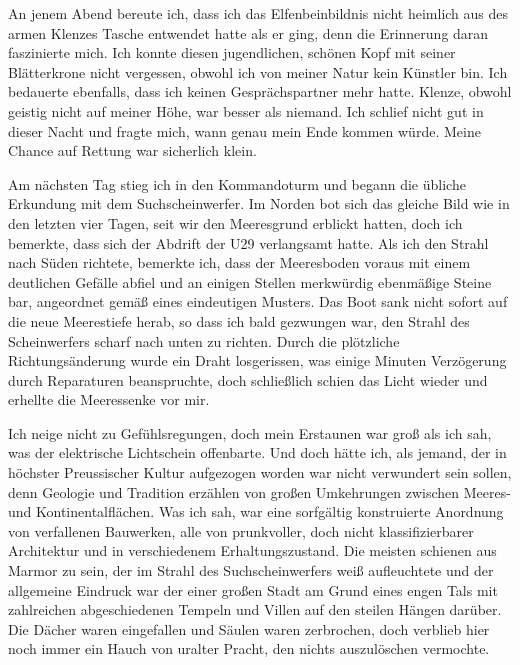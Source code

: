 \documentclass[a4paper]{memoir}
\begin{document}
An jenem Abend bereute ich, dass ich das Elfenbeinbildnis nicht heimlich aus des armen Klenzes Tasche entwendet hatte als er ging, denn die Erinnerung daran faszinierte mich. Ich konnte diesen jugendlichen, schönen Kopf mit seiner Blätterkrone nicht vergessen, obwohl ich von meiner Natur kein Künstler bin. Ich bedauerte ebenfalls, dass ich keinen Gesprächspartner mehr hatte. Klenze, obwohl geistig nicht auf meiner Höhe, war besser als niemand. Ich schlief nicht gut in dieser Nacht und fragte mich, wann genau mein Ende kommen würde. Meine Chance auf Rettung war sicherlich klein.

Am nächsten Tag stieg ich in den Kommandoturm und begann die übliche Erkundung mit dem Suchscheinwerfer. Im Norden bot sich das gleiche Bild wie in den letzten vier Tagen, seit wir den Meeresgrund erblickt hatten, doch ich bemerkte, dass sich der Abdrift der U29 verlangsamt hatte. Als ich den Strahl nach Süden richtete, bemerkte ich, dass der Meeresboden voraus mit einem deutlichen Gefälle abfiel und an einigen Stellen merkwürdig ebenmäßige Steine bar, angeordnet gemäß eines eindeutigen Musters. Das Boot sank nicht sofort auf die neue Meerestiefe herab, so dass ich bald gezwungen war, den Strahl des Scheinwerfers scharf nach unten zu richten. Durch die plötzliche Richtungsänderung wurde ein Draht losgerissen, was einige Minuten Verzögerung durch Reparaturen beanspruchte, doch schließlich schien das Licht wieder und erhellte die Meeressenke vor mir.

Ich neige nicht zu Gefühlsregungen, doch mein Erstaunen war groß als ich sah, was der elektrische Lichtschein offenbarte. Und doch hätte ich, als jemand, der in höchster Preussischer Kultur aufgezogen worden war nicht verwundert sein sollen, denn Geologie und Tradition erzählen von großen Umkehrungen zwischen Meeres- und Kontinentalflächen. Was ich sah, war eine sorfgältig konstruierte Anordnung von verfallenen Bauwerken, alle von prunkvoller, doch nicht klassifizierbarer Architektur und in verschiedenem Erhaltungszustand. Die meisten schienen aus Marmor zu sein, der im Strahl des Suchscheinwerfers weiß aufleuchtete und der allgemeine Eindruck war der einer großen Stadt am Grund eines engen Tals mit zahlreichen abgeschiedenen Tempeln und Villen auf den steilen Hängen darüber. Die Dächer waren eingefallen und Säulen waren zerbrochen, doch verblieb hier noch immer ein Hauch von uralter Pracht, den nichts auszulöschen vermochte.
\end{document}
